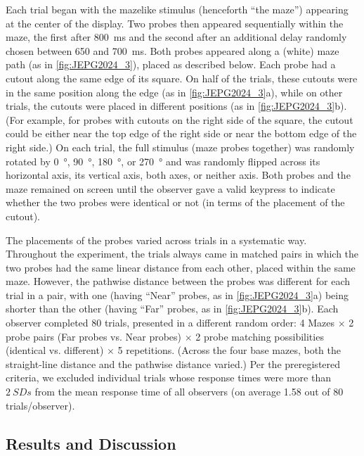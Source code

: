 Each trial began with the mazelike stimulus (henceforth “the maze”) appearing at the center of the display. Two probes then appeared sequentially within the maze, the first after \qty{800}{ms} and the second after an additional delay randomly chosen between 650 and \qty{700}{ms}. Both probes appeared along a (white) maze path (as in \cref{fig:JEPG2024_3}), placed as described below. Each probe had a cutout along the same edge of its square. On half of the trials, these cutouts were in the same position along the edge (as in \cref{fig:JEPG2024_3}a), while on other trials, the cutouts were placed in different positions (as in \cref{fig:JEPG2024_3}b). (For example, for probes with cutouts on the right side of the square, the cutout could be either near the top edge of the right side or near the bottom edge of the right side.) On each trial, the full stimulus (maze probes together) was randomly rotated by \qty{0}{\degree}, \qty{90}{\degree}, \qty{180}{\degree}, or \qty{270}{\degree} and was randomly flipped across its horizontal axis, its vertical axis, both axes, or neither axis. Both probes and the maze remained on screen until the observer gave a valid keypress to indicate whether the two probes were identical or not (in terms of the placement of the cutout).

The placements of the probes varied across trials in a systematic way. Throughout the experiment, the trials always came in matched pairs in which the two probes had the same linear distance from each other, placed within the same maze. However, the pathwise distance between the probes was different for each trial in a pair, with one (having “Near” probes, as in \cref{fig:JEPG2024_3}a) being shorter than the other (having “Far” probes, as in \cref{fig:JEPG2024_3}b). Each observer completed 80 trials, presented in a different random order: 4 Mazes $\times$ 2 probe pairs (Far probes vs. Near probes) $\times$ 2 probe matching possibilities (identical vs. different) $\times$ 5 repetitions. (Across the four base mazes, both the straight-line distance and the pathwise distance varied.) Per the preregistered criteria, we excluded individual trials whose response times were more than $2~SDs$ from the mean response time of all observers (on average 1.58 out of 80 trials/observer).

\subsection{Results and Discussion}

